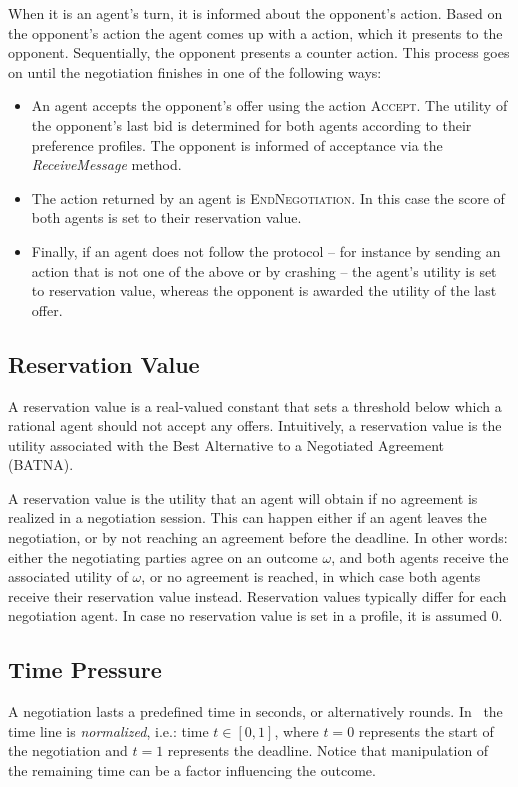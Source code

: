 \documentclass[]{article}
\begin{document}
When it is an agent's turn, it is informed about the opponent's action. Based on the opponent's action the agent comes up with a action, which it presents to the opponent. Sequentially, the opponent presents a counter action. This process goes on until the negotiation finishes in one of the following ways:
\begin{itemize}
	\item An agent accepts the opponent's offer using the action \textsc{Accept}. The utility of the opponent's last bid is determined for both agents according to their preference profiles. The opponent is informed of acceptance via the \textit{ReceiveMessage} method.
	\item The action returned by an agent is \textsc{EndNegotiation}. In this case the score of both agents is set to their reservation value.
	\item Finally, if an agent does not follow the protocol -- for instance by sending an action that is not one of the above or by crashing -- the agent's utility is set to reservation value, whereas the opponent is awarded the utility of the last offer.
\end{itemize}
 
\subsection{Reservation Value}
A reservation value is a real-valued constant that sets a threshold below which a rational agent should not accept any offers. Intuitively, a reservation value is the utility associated with the Best Alternative to a Negotiated Agreement (BATNA).

A reservation value is the utility that an agent will obtain if no agreement is realized in a negotiation session. This can happen either if an agent leaves the negotiation, or by not reaching an agreement before the deadline. In other words: either the negotiating parties agree on an outcome $\omega$, and both agents receive the associated utility of $\omega$, or no agreement is reached, in which case both agents receive their reservation value instead. Reservation values typically differ for each negotiation agent. In case no reservation value is set in a profile, it is assumed 0.


\subsection{Time Pressure}
A negotiation lasts a predefined time in seconds, or alternatively rounds. In \Genius~the time line is \emph{normalized}, i.e.: time $t \in [0, 1]$, where $t = 0$ represents the start of the negotiation and $t = 1$ represents the deadline. Notice that manipulation of the remaining time can be a factor influencing the outcome.
\end{document}
